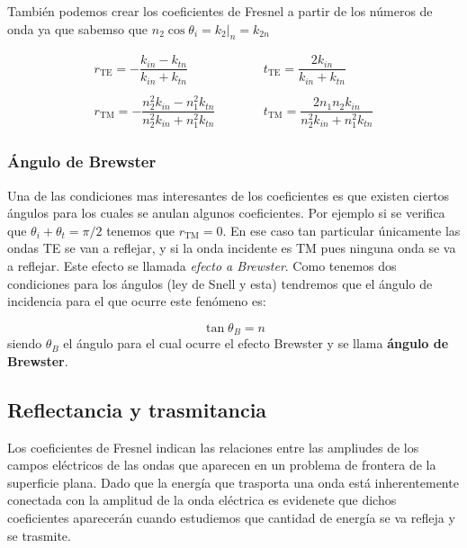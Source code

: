 \documentclass[12pt,a4paper]{article}
\newcommand{\tquad}{\quad \quad \quad}
\numberwithin{equation}{section}
\numberwithin{figure}{section}
\begin{document}
También podemos crear los coeficientes de Fresnel a partir de los números de onda ya que sabemso que $n_2 \cos \theta_i = k_2 |_n = k_{2n}$

\begin{equation}
\begin{array}{ll}
r_{\mathrm{TE}} = - \dfrac{k_{in}-k_{tn}}{k_{in}+k_{tn}}
\tquad &
t_{\mathrm{TE}} =  \dfrac{2 k_{in}}{k_{in}+k_{tn}}
\\ \\
r_{\mathrm{TM}} = - \dfrac{n_2^2 k_{in}-n_1^2k_{tn}}{n_2^2 k_{in}+n_1^2k_{tn}}
\tquad &
t_{\mathrm{TM}} =  \dfrac{2 n_1 n_2 k_{in}}{ n_2^2 k_{in}+n_1^2k_{tn}}
\end{array} \label{Ec:6.3.3.23}
\end{equation}


\subsubsection{Ángulo de Brewster}

Una de las condiciones mas interesantes de los coeficientes es que existen ciertos ángulos para los cuales se anulan algunos coeficientes. Por ejemplo si se verifica que $\theta_i+\theta_t = \pi/2 $ tenemos que $r_{\mathrm{TM}}=0$. En ese caso tan particular únicamente las ondas TE se van a reflejar, y si la onda incidente es TM pues ninguna onda se va a reflejar. Este efecto se llamada \textit{efecto a Brewster}. Como tenemos dos condiciones para los ángulos (ley de Snell y esta) tendremos que el ángulo de incidencia para el que ocurre este fenómeno es:

\begin{equation}
\tan \theta_B = n 
\end{equation}
siendo $\theta_B$ el ángulo para el cual ocurre el efecto Brewster y se llama \textbf{ángulo de Brewster}.

\subsection{Reflectancia y trasmitancia}

Los coeficientes de Fresnel indican las relaciones entre las ampliudes de los campos eléctricos de las ondas que aparecen en un problema de frontera de la superficie plana. Dado que la energía que trasporta una onda está inherentemente conectada con la amplitud de la onda eléctrica es evidenete que dichos coeficientes aparecerán cuando estudiemos que cantidad de energía se va refleja y se trasmite. \\
\end{document}
